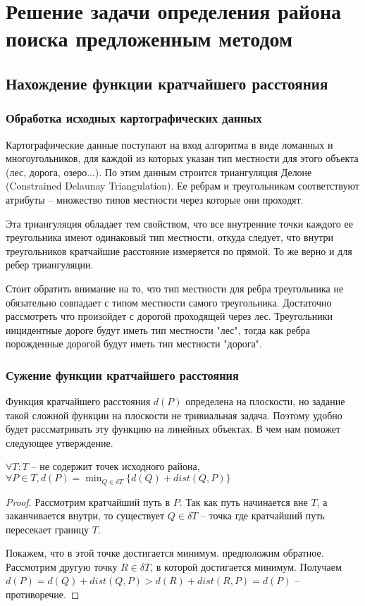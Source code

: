 \everymath{\displaystyle}

\chapter{Решение задачи определения района поиска предложенным методом}
\section{Нахождение функции кратчайшего расстояния}
\subsection{Обработка исходных картографических данных}
Картографические данные поступают на вход алгоритма в
виде ломанных и многоугольников, для каждой из которых указан тип местности
для этого объекта (лес, дорога, озеро...). По этим данным строится триангуляция
Делоне (Constrained Delaunay Triangulation). Ее ребрам и треугольникам
соответствуют атрибуты -- множество типов местности через которые они проходят.

Эта триангуляция обладает тем свойством, что все внутренние точки каждого ее
треугольника имеют одинаковый тип местности, откуда следует, что внутри
треугольников кратчайшие расстояние измеряется по прямой. То же верно и
для ребер триангуляции.

Стоит обратить внимание на то, что тип местности для ребра треугольника
не обязательно совпадает с типом местности самого треугольника. Достаточно
рассмотреть что произойдет с дорогой проходящей через лес. Треугольники
инцидентные дороге будут иметь тип местности "лес", тогда как ребра
порожденные дорогой будут иметь тип местности "дорога".

\subsection{Сужение функции кратчайшего расстояния}
Функция кратчайшего расстояния $d(P)$ определена на плоскости, но
задание такой сложной функции на плоскости не тривиальная задача.
Поэтому удобно будет рассматривать эту функцию на линейных объектах.
В чем нам поможет следующее утверждение.

{\prop\label{sh_path}
$\forall T: T$ -- не содержит точек исходного района,
$\forall P \in T, d(P) = \min_{Q \in \delta T} \{d(Q) + dist(Q, P)\}$}
\begin{proof}
Рассмотрим кратчайший путь в $P$. Так как путь начинается вне $T$,
а заканчивается внутри, то существует $Q \in \delta T$ -- точка
где кратчайший путь пересекает границу $T$.

Покажем, что в этой точке достигается минимум. предположим обратное.
Рассмотрим другую точку $R \in \delta T$, в которой достигается минимум.
Получаем $d(P) = d(Q) + dist(Q, P) > d(R) + dist(R, P) = d(P)$ -- противоречие.
\end{proof}

